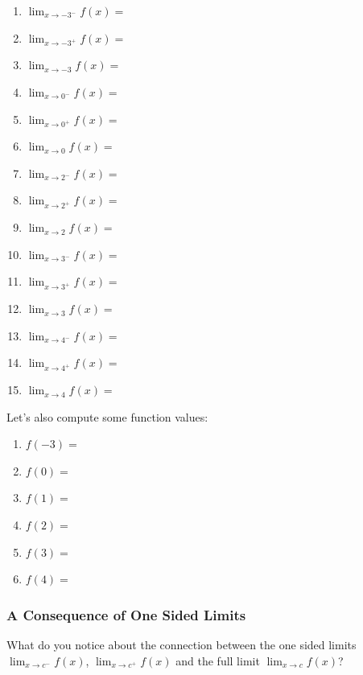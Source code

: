 \documentclass[12pt]{report}
\begin{document}
\begin{multicols}{3}
\begin{enumerate}[parsep=.25in]

\item $\displaystyle\lim_{x\rightarrow-3^-}f(x)=$ 
\item $\displaystyle\lim_{x\rightarrow-3^+}f(x)=$
\item $\displaystyle\lim_{x\rightarrow-3}f(x)=$ 
\item $\displaystyle\lim_{x\rightarrow0^-}f(x)=$ 
\item $\displaystyle\lim_{x\rightarrow0^+}f(x)=$ 
\item $\displaystyle\lim_{x\rightarrow0}f(x)=$ 
\item $\displaystyle\lim_{x\rightarrow2^-}f(x)=$ 
\item $\displaystyle\lim_{x\rightarrow2^+}f(x)=$ 
\item $\displaystyle\lim_{x\rightarrow2}f(x)=$ 
\item $\displaystyle\lim_{x\rightarrow3^-}f(x)=$ 
\item $\displaystyle\lim_{x\rightarrow3^+}f(x)=$ 
\item $\displaystyle\lim_{x\rightarrow3}f(x)=$ 
\item $\displaystyle\lim_{x\rightarrow4^-}f(x)=$ 
\item $\displaystyle\lim_{x\rightarrow4^+}f(x)=$ 
\item $\displaystyle\lim_{x\rightarrow4}f(x)=$ 
\end{enumerate}

\bigskip
\bigskip
Let's also compute some function values:

\bigskip

\begin{enumerate}[parsep=.1in]
\item $f(-3)=$
\item $f(0)=$
\item $f(1)=$
\item $f(2)=$
\item $f(3)=$
\item $f(4)=$
\end{enumerate}
\end{multicols}

\subsubsection*{A Consequence of One Sided Limits}
What do you notice about the connection between the one sided limits 
$\displaystyle\lim_{x\rightarrow c^-}f(x)$, $\displaystyle\lim_{x\rightarrow c^+}f(x)$ 
and the full limit $\displaystyle\lim_{x\rightarrow c}f(x)$?
\\\\\\\\\\\\\\\\\\\\\\\\\\
\end{document}
